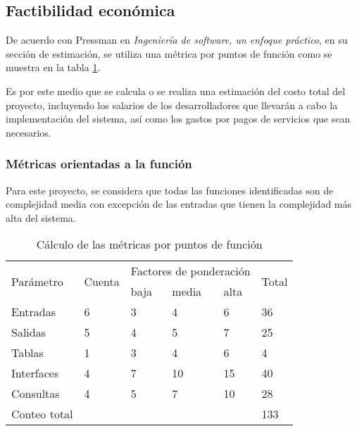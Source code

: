 \subsection{Factibilidad económica}

De acuerdo con Pressman en \textit{Ingeniería de software, un enfoque práctico}\cite{pressman_software_2005}, en su sección de estimación, se utiliza una métrica por puntos de función como se muestra en la tabla \ref{tab:function_point_metrics}. 


Es por este medio que se calcula o se realiza una estimación del costo total del proyecto, incluyendo los salarios de los desarrolladores que llevarán a cabo la implementación del sistema, así como los gastos por pagos de servicios que sean necesarios.

\subsubsection{Métricas orientadas a la función}


Para este proyecto, se considera que todas las funciones identificadas son de complejidad media con excepción de las entradas que tienen la complejidad más alta del sistema.


\begin{table}
	\begin{tabular}{|l|l|l|l|l|l|}
	\hline
	\multirow{2}{*}{Parámetro} & \multirow{2}{*}{Cuenta} & \multicolumn{3}{|l|}{Factores de ponderación} & \multirow{2}{*}{Total} \\ \cline{3-5}
														 &                         & baja       	& media       & alta		       &                        \\ \hline
	Entradas                   & 6                       & 3            & 4           & 6              & 36                     \\ \hline
	Salidas                     & 5                       & 4            & 5           & 7              & 25                     \\ \hline
	Tablas                     & 1                       & 3            & 4           & 6              & 4                      \\ \hline
	Interfaces                 & 4                       & 7            & 10          & 15             & 40                     \\ \hline
	Consultas                  & 4                       & 5            & 7           & 10             & 28                     \\ \hline
	Conteo total               &                         &              &             &		             & 133                    \\ \hline
	\end{tabular}
	\caption{Cálculo de las métricas por puntos de función}
	\label{tab:function_point_metrics}
	\end{table}


